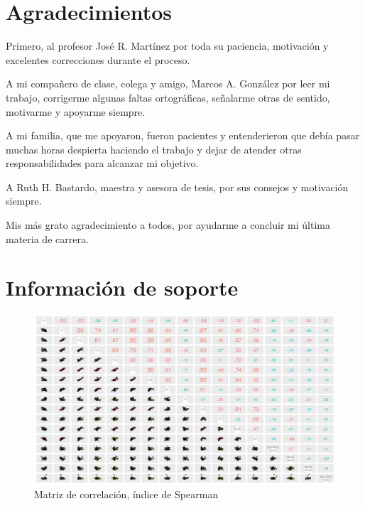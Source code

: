 \documentclass[11pt,]{article}
\newcommand{\beginsupplement}{ \setcounter{table}{0} \renewcommand{\thetable}{S\arabic{table}} \setcounter{figure}{0} \renewcommand{\thefigure}{S\arabic{figure}} }
\begin{document}
\section{Agradecimientos}\label{agradecimientos}

Primero, al profesor José R. Martínez por toda su paciencia, motivación
y excelentes correcciones durante el proceso.

A mi compañero de clase, colega y amigo, Marcos A. González por leer mi
trabajo, corrigerme algunas faltas ortográficas, señalarme otras de
sentido, motivarme y apoyarme siempre.

A mi familia, que me apoyaron, fueron pacientes y entenderieron que
debía pasar muchas horas despierta haciendo el trabajo y dejar de
atender otras responsabilidades para alcanzar mi objetivo.

A Ruth H. Bastardo, maestra y asesora de tesis, por sus consejos y
motivación siempre.

Mis más grato agradecimiento a todos, por ayudarme a concluir mi última
materia de carrera.

\section{Información de soporte}\label{informaciuxf3n-de-soporte}

\beginsupplement

\begin{figure}
\centering
\includegraphics{matriz_correlacion_suelo_abun_riq_spearman.png}
\caption{Matriz de correlación, índice de Spearman
\label{fig:matriz_spearman}}
\end{figure}
\end{document}
